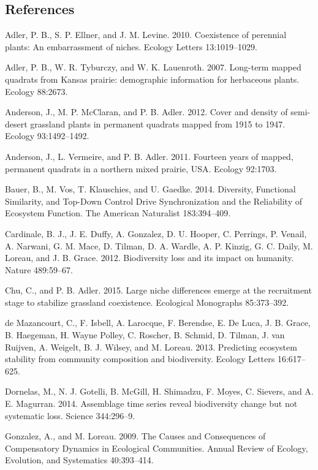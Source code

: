 \documentclass[12pt,]{article}
\begin{document}
\setlength{\parindent}{0ex}

\pagebreak{}

\subsection*{References}\label{references}

Adler, P. B., S. P. Ellner, and J. M. Levine. 2010. Coexistence of
perennial plants: An embarrassment of niches. Ecology Letters
13:1019--1029.

Adler, P. B., W. R. Tyburczy, and W. K. Lauenroth. 2007. Long-term
mapped quadrats from Kansas prairie: demographic information for
herbaceous plants. Ecology 88:2673.

Anderson, J., M. P. McClaran, and P. B. Adler. 2012. Cover and density
of semi-desert grassland plants in permanent quadrats mapped from 1915
to 1947. Ecology 93:1492--1492.

Anderson, J., L. Vermeire, and P. B. Adler. 2011. Fourteen years of
mapped, permanent quadrats in a northern mixed prairie, USA. Ecology
92:1703.

Bauer, B., M. Vos, T. Klauschies, and U. Gaedke. 2014. Diversity,
Functional Similarity, and Top-Down Control Drive Synchronization and
the Reliability of Ecosystem Function. The American Naturalist
183:394--409.

Cardinale, B. J., J. E. Duffy, A. Gonzalez, D. U. Hooper, C. Perrings,
P. Venail, A. Narwani, G. M. Mace, D. Tilman, D. A. Wardle, A. P.
Kinzig, G. C. Daily, M. Loreau, and J. B. Grace. 2012. Biodiversity loss
and its impact on humanity. Nature 489:59--67.

Chu, C., and P. B. Adler. 2015. Large niche differences emerge at the
recruitment stage to stabilize grassland coexistence. Ecological
Monographs 85:373--392.

{{de Mazancourt}}, C., F. Isbell, A. Larocque, F. Berendse, E. {De
Luca}, J. B. Grace, B. Haegeman, H. {Wayne Polley}, C. Roscher, B.
Schmid, D. Tilman, J. van Ruijven, A. Weigelt, B. J. Wilsey, and M.
Loreau. 2013. Predicting ecosystem stability from community composition
and biodiversity. Ecology Letters 16:617--625.

Dornelas, M., N. J. Gotelli, B. McGill, H. Shimadzu, F. Moyes, C.
Sievers, and A. E. Magurran. 2014. Assemblage time series reveal
biodiversity change but not systematic loss. Science 344:296--9.

Gonzalez, A., and M. Loreau. 2009. The Causes and Consequences of
Compensatory Dynamics in Ecological Communities. Annual Review of
Ecology, Evolution, and Systematics 40:393--414.
\end{document}
